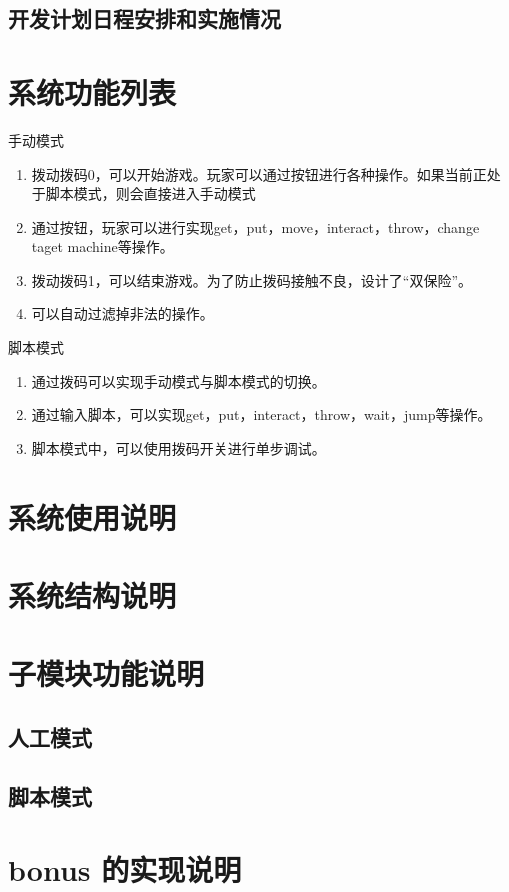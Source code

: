 \documentclass[12pt, a4paper]{ctexart}
\begin{document}
\subsection{开发计划日程安排和实施情况}

\section{系统功能列表}
手动模式
\begin{enumerate}
	\item 拨动拨码0，可以开始游戏。玩家可以通过按钮进行各种操作。如果当前正处于脚本模式，则会直接进入手动模式
	\item 通过按钮，玩家可以进行实现get，put，move，interact，throw，change taget machine等操作。
	\item 拨动拨码1，可以结束游戏。为了防止拨码接触不良，设计了“双保险”。
	\item 可以自动过滤掉非法的操作。
\end{enumerate}

脚本模式
\begin{enumerate}
	\item 通过拨码可以实现手动模式与脚本模式的切换。
	\item 通过输入脚本，可以实现get，put，interact，throw，wait，jump等操作。
	\item 脚本模式中，可以使用拨码开关进行单步调试。
\end{enumerate}

\section{系统使用说明}

\section{系统结构说明}

\section{子模块功能说明}
\subsection{人工模式}

\subsection{脚本模式}

\section{bonus 的实现说明}
\end{document}
